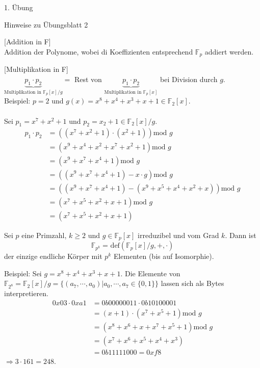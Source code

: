 \begin{section}{1. Übung}
\begin{subsection}{Hinweise zu Übungsblatt 2}
\begin{enumerate}
    \begin{satz}{[Addition in F]} \\
      Addition der Polynome, wobei di Koeffizienten entsprechend $\mathbb{F}_p$ addiert werden. 
    \end{satz}
    \begin{satz}{[Multiplikation in F]} \\
      $\underbrace{p_1 \cdot p_2}_{\text{Multiplikation in }\mathbb{F}_p[x]/g} = $ Rest von $\underbrace{p_1 \cdot p_2}_{\text{Multiplikation in }\mathbb{F}_p[x]} $ bei Division durch $g$. \\
      Beispiel: $p = 2$ und $g(x) = x^8+x^4+x^3+x+1 \in \mathbb{F}_2[x]$. \\ \\
      Sei $p_1 = x^7+x^2+1$ und $p_2 = x_2 +1 \in \mathbb{F}_2[x]/g$.
      \begin{align*}
       p_1 \cdot p_2 & = ((x^7+x^2+1)\cdot(x^2+1)) \text{mod }g \\
       & = (x^9+x^4+x^2+x^7+x^2+1) \text{mod }g \\
       & = (x^9+x^7+x^4+1)  \text{mod }g\\
       & = ((x^9+x^7+x^4+1) -x\cdot g ) \text{mod }g\\
       & = ((x^9+x^7+x^4+1)-(x^9+x^5+x^4+x^2+x)) \text{mod }g \\
       & = (x^7+x^5+x^2+x+1) \text{mod }g \\
       & = (x^7+x^5+x^2+x+1)
      \end{align*}
    \end{satz}

    \begin{satz}
     Sei $p$ eine Primzahl, $k \geq 2$ und $g \in \mathbb{F}_p[x]$ irreduzibel und vom Grad $k$. Dann ist
     \[\mathbb{F}_{p^k} =_{}\text{def} (\mathbb{F}_p[x]/g, +, \cdot)\]
     der einzige endliche Körper mit $p^k$ Elementen (bis auf Isomorphie).
    \end{satz}
    
    Beispiel: Sei $g = x^8+x^4+x^3+x+1$. Die Elemente von $\mathbb{F}_{2^8} = \mathbb{F}_2[x]/g = \{(a_7, \cdots, a_0) | a_0,\cdots , a_7 \in \{0,1\}\}$ lassen sich als Bytes interpretieren.
    \begin{align*}
     0x03 \cdot 0xa1 & = 0b00000011 \cdot 0b10100001 \\
     & = (x+1) \cdot (x^7+x^5+1) \text{mod }g \\
     & = (x^8+x^6+x+x^7+x^5+1)  \text{mod }g \\
     & = (x^7+x^6+x^5+x^4+x^3) \\
     & = 0b11111000 = 0xf8
    \end{align*}
    $\Rightarrow 3 \cdot 161 = 248$.


    
   \end{enumerate}

  \end{subsection}


\end{section}
